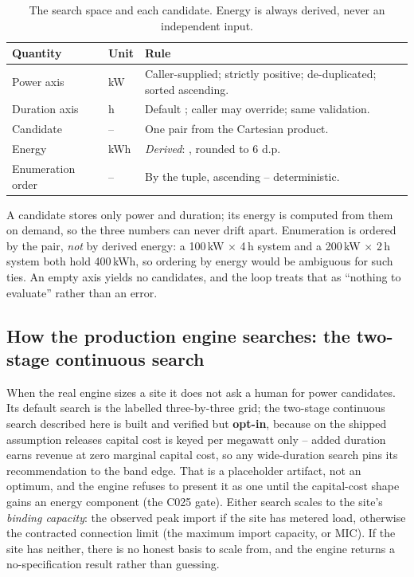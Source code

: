 \begin{table}[H]
\centering
\caption{The search space and each candidate. Energy is always derived, never an independent input.}
\label{tab:searchspace}
\small\sffamily
\begin{tabularx}{\textwidth}{@{}l l L@{}}
\toprule
\textbf{Quantity} & \textbf{Unit} & \textbf{Rule} \\
\midrule
Power axis & kW & Caller-supplied; strictly positive; de-duplicated; sorted ascending. \\
Duration axis & h & Default ; caller may override; same validation. \\
Candidate & -- & One  pair from the Cartesian product. \\
Energy & kWh & \emph{Derived}: , rounded to 6 d.p. \\
Enumeration order & -- & By the  tuple, ascending -- deterministic. \\
\bottomrule
\end{tabularx}
\end{table}

\begin{caution}
A candidate stores only power and duration; its energy is computed from them on demand, so the three numbers can never drift apart. Enumeration is ordered by the  pair, \emph{not} by derived energy: a 100\,kW $\times$ 4\,h system and a 200\,kW $\times$ 2\,h system both hold 400\,kWh, so ordering by energy would be ambiguous for such ties. An empty axis yields no candidates, and the loop treats that as ``nothing to evaluate'' rather than an error.
\end{caution}

\subsection{How the production engine searches: the two-stage continuous search}

When the real engine sizes a site it does not ask a human for power candidates. Its default search is the labelled three-by-three grid; the two-stage continuous search described here is built and verified but \textbf{opt-in}, because on the shipped assumption releases capital cost is keyed per megawatt only -- added duration earns revenue at zero marginal capital cost, so any wide-duration search pins its recommendation to the band edge. That is a placeholder artifact, not an optimum, and the engine refuses to present it as one until the capital-cost shape gains an energy component (the C025 gate). Either search scales to the site's \emph{binding capacity}: the observed peak import if the site has metered load, otherwise the contracted connection limit (the maximum import capacity, or MIC). If the site has neither, there is no honest basis to scale from, and the engine returns a no-specification result rather than guessing.

